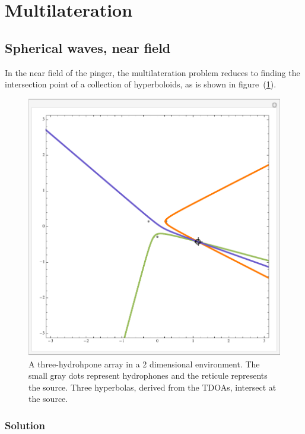 \documentclass[10pt]{article}
\begin{document}
\section{Multilateration}

\subsection{Spherical waves, near field}
\label{sec:near-field}

In the near field of the pinger, the multilateration problem reduces to finding the intersection point of a collection of hyperboloids, as is shown in figure~(\ref{fig:hyperbola-good}).

\begin{figure}[htbp]
\begin{center}
\includegraphics[scale=0.5]{hyperbola-good.pdf}
\caption{A three-hydrohpone array in a 2 dimensional environment.  The small gray dots represent hydrophones and the reticule represents the source.  Three hyperbolas, derived from the TDOAs, intersect at the source.}
\label{fig:hyperbola-good}
\end{center}
\end{figure}

\subsubsection{Solution}
\end{document}
